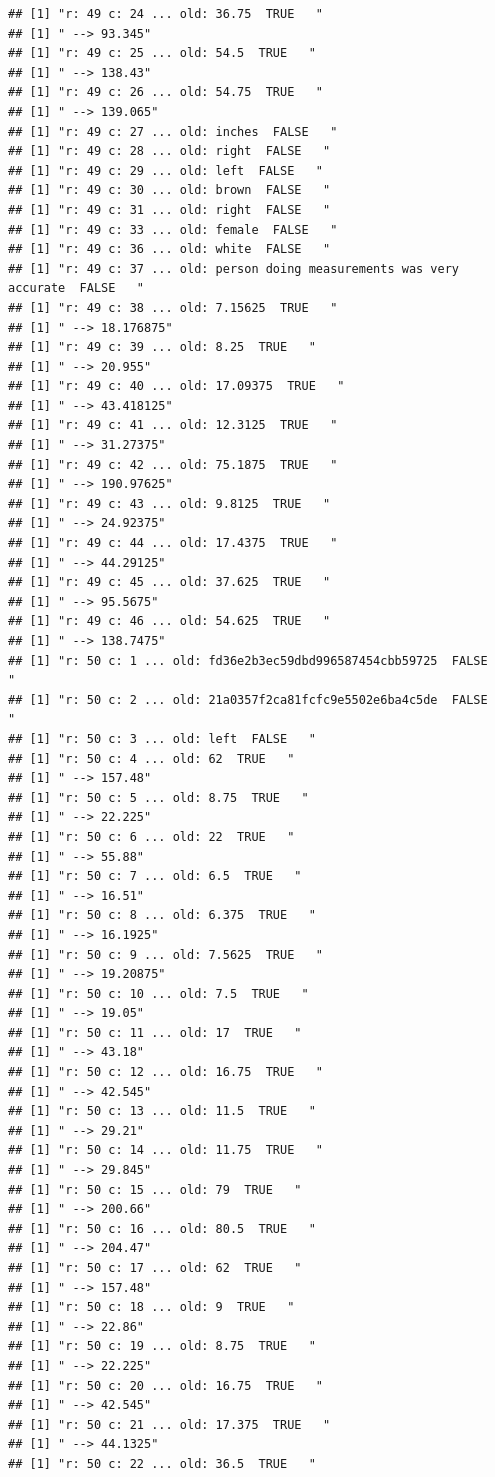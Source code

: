 \documentclass[]{article}
\begin{document}
\begin{verbatim}
## [1] "r: 49 c: 24 ... old: 36.75  TRUE   "
## [1] " --> 93.345"
## [1] "r: 49 c: 25 ... old: 54.5  TRUE   "
## [1] " --> 138.43"
## [1] "r: 49 c: 26 ... old: 54.75  TRUE   "
## [1] " --> 139.065"
## [1] "r: 49 c: 27 ... old: inches  FALSE   "
## [1] "r: 49 c: 28 ... old: right  FALSE   "
## [1] "r: 49 c: 29 ... old: left  FALSE   "
## [1] "r: 49 c: 30 ... old: brown  FALSE   "
## [1] "r: 49 c: 31 ... old: right  FALSE   "
## [1] "r: 49 c: 33 ... old: female  FALSE   "
## [1] "r: 49 c: 36 ... old: white  FALSE   "
## [1] "r: 49 c: 37 ... old: person doing measurements was very accurate  FALSE   "
## [1] "r: 49 c: 38 ... old: 7.15625  TRUE   "
## [1] " --> 18.176875"
## [1] "r: 49 c: 39 ... old: 8.25  TRUE   "
## [1] " --> 20.955"
## [1] "r: 49 c: 40 ... old: 17.09375  TRUE   "
## [1] " --> 43.418125"
## [1] "r: 49 c: 41 ... old: 12.3125  TRUE   "
## [1] " --> 31.27375"
## [1] "r: 49 c: 42 ... old: 75.1875  TRUE   "
## [1] " --> 190.97625"
## [1] "r: 49 c: 43 ... old: 9.8125  TRUE   "
## [1] " --> 24.92375"
## [1] "r: 49 c: 44 ... old: 17.4375  TRUE   "
## [1] " --> 44.29125"
## [1] "r: 49 c: 45 ... old: 37.625  TRUE   "
## [1] " --> 95.5675"
## [1] "r: 49 c: 46 ... old: 54.625  TRUE   "
## [1] " --> 138.7475"
## [1] "r: 50 c: 1 ... old: fd36e2b3ec59dbd996587454cbb59725  FALSE   "
## [1] "r: 50 c: 2 ... old: 21a0357f2ca81fcfc9e5502e6ba4c5de  FALSE   "
## [1] "r: 50 c: 3 ... old: left  FALSE   "
## [1] "r: 50 c: 4 ... old: 62  TRUE   "
## [1] " --> 157.48"
## [1] "r: 50 c: 5 ... old: 8.75  TRUE   "
## [1] " --> 22.225"
## [1] "r: 50 c: 6 ... old: 22  TRUE   "
## [1] " --> 55.88"
## [1] "r: 50 c: 7 ... old: 6.5  TRUE   "
## [1] " --> 16.51"
## [1] "r: 50 c: 8 ... old: 6.375  TRUE   "
## [1] " --> 16.1925"
## [1] "r: 50 c: 9 ... old: 7.5625  TRUE   "
## [1] " --> 19.20875"
## [1] "r: 50 c: 10 ... old: 7.5  TRUE   "
## [1] " --> 19.05"
## [1] "r: 50 c: 11 ... old: 17  TRUE   "
## [1] " --> 43.18"
## [1] "r: 50 c: 12 ... old: 16.75  TRUE   "
## [1] " --> 42.545"
## [1] "r: 50 c: 13 ... old: 11.5  TRUE   "
## [1] " --> 29.21"
## [1] "r: 50 c: 14 ... old: 11.75  TRUE   "
## [1] " --> 29.845"
## [1] "r: 50 c: 15 ... old: 79  TRUE   "
## [1] " --> 200.66"
## [1] "r: 50 c: 16 ... old: 80.5  TRUE   "
## [1] " --> 204.47"
## [1] "r: 50 c: 17 ... old: 62  TRUE   "
## [1] " --> 157.48"
## [1] "r: 50 c: 18 ... old: 9  TRUE   "
## [1] " --> 22.86"
## [1] "r: 50 c: 19 ... old: 8.75  TRUE   "
## [1] " --> 22.225"
## [1] "r: 50 c: 20 ... old: 16.75  TRUE   "
## [1] " --> 42.545"
## [1] "r: 50 c: 21 ... old: 17.375  TRUE   "
## [1] " --> 44.1325"
## [1] "r: 50 c: 22 ... old: 36.5  TRUE   "

\end{verbatim}
\end{document}
